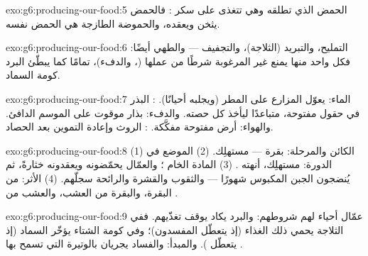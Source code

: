\begin{solution}{exo:g6:producing-our-food:5}
الحمض الذي تطلقه  وهي تتغذى على سكر : فالحمض يثخن
 ويعقده، والحموضة الطازجة هي الحمض نفسه.
\end{solution}

\begin{solution}{exo:g6:producing-our-food:6}
التمليح، والتبريد (الثلاجة)، والتجفيف --- والطهي أيضًا: فكل واحد
منها يمنع  غير المرغوبة شرطًا من  عملها (،
والدفء)، تمامًا كما يبطّئ البرد كومة السماد.
\end{solution}

\begin{solution}{exo:g6:producing-our-food:7}
الماء: يعوّل المزارع على المطر (ويجلبه أحيانًا). : البذر في
حقول مفتوحة، متباعدًا ليأخذ كل  حصته. والدفء: بذار موقوت على
الموسم الدافئ. والهواء: أرض مفتوحة  مفكَّكة. : الروث وإعادة التموين بعد الحصاد.
\end{solution}

\begin{solution}{exo:g6:producing-our-food:8}
(1) الكائن والمرحلة:  بقرة ---  مستهلِك. (2) الموضع في
الدورة:  مستهلِك، أنهته . (3) المادة الخام ؛
والعمّال يحمّضونه ويعقدونه خثارةً، ثم يُنضجون الجبن المكبوس شهورًا
--- والثقوب والقشرة والرائحة سجلّهم. (4) الأثر:  من البقرة،
والبقرة من العشب، والعشب من .
\end{solution}

\begin{solution}{exo:g6:producing-our-food:9}
 عمّال أحياء لهم شروطهم: والبرد يكاد يوقف تغذّيهم. ففي
الثلاجة يحمي ذلك الغذاء (إذ يتعطّل المفسدون)؛ وفي كومة الشتاء
يؤخّر السماد (إذ يتعطّل ). والمبدأ:  والفساد يجريان
بالوتيرة التي تسمح بها .
\end{solution}

